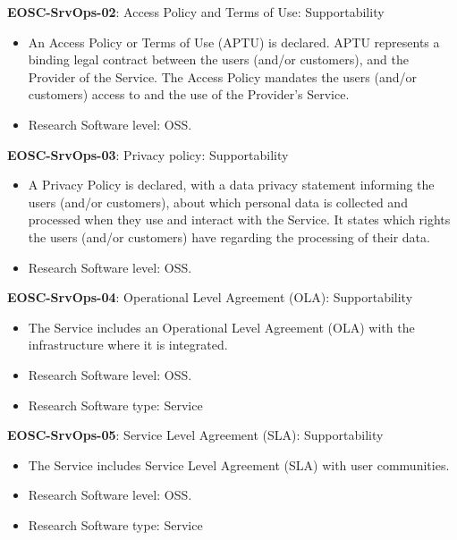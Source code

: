 \textbf{EOSC-SrvOps-02}: Access Policy and Terms of Use: Supportability

\begin{itemize}
    \item An Access Policy or Terms of Use (APTU) is declared. APTU represents a binding legal contract between the users (and/or customers), and the Provider of the Service. The Access Policy mandates the users (and/or customers) access to and the use of the Provider's Service.~\cite{orviz_fernandez_eosc-synergy_2020}
    \item Research Software level: OSS.
\end{itemize}

\textbf{EOSC-SrvOps-03}: Privacy policy: Supportability

\begin{itemize}
    \item A Privacy Policy is declared, with a data privacy statement informing the users (and/or customers), about which personal data is collected and processed when they use and interact with the Service. It states which rights the users (and/or customers) have regarding the processing of their data.~\cite{orviz_fernandez_eosc-synergy_2020}
    \item Research Software level: OSS.
\end{itemize}

\textbf{EOSC-SrvOps-04}: Operational Level Agreement (OLA): Supportability

\begin{itemize}
    \item The Service includes an Operational Level Agreement (OLA) with the infrastructure where it is integrated.~\cite{orviz_fernandez_eosc-synergy_2020}
    \item Research Software level: OSS.
    \item Research Software type: Service
\end{itemize}

\textbf{EOSC-SrvOps-05}: Service Level Agreement (SLA): Supportability

\begin{itemize}
    \item The Service includes Service Level Agreement (SLA) with user communities.~\cite{orviz_fernandez_eosc-synergy_2020}
    \item Research Software level: OSS.
    \item Research Software type: Service
\end{itemize}


